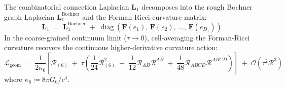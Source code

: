 \documentclass[
    12pt,
    a4paper,
    headings=normal,
    twoside=false,
    open=any,
    parskip=half
]{scrbook}
\begin{document}
\begin{phystheorem}\label{thm:ch1_bochner_weitzenboeck_discrete}
The combinatorial connection Laplacian $\mathbf{L}_1$ decomposes into the rough Bochner graph Laplacian $\mathbf{L}_1^{\text{Bochner}}$ and the Forman-Ricci curvature matrix:
\begin{equation}
\boxed{\mathbf{L}_1 \;=\; \mathbf{L}_1^{\text{Bochner}} \;+\; \operatorname{diag}\left( \mathbf{F}(e_1), \, \mathbf{F}(e_2), \, \dots, \, \mathbf{F}(e_{D_1}) \right)}
\label{eq:ch1_bochner_weitzenboeck_formula}
\end{equation}
In the coarse-grained continuum limit ($\tau \to 0$), cell-averaging the Forman-Ricci curvature recovers the continuous higher-derivative curvature action:
\begin{equation}
\mathcal{L}_{\text{geom}} \;=\; \frac{1}{2\kappa_6} \left[ \mathcal{R}_{(6)} \;+\; \tau \left( \frac{1}{24} \mathcal{R}_{(6)}^2 \;-\; \frac{1}{12} \mathcal{R}_{AB} \mathcal{R}^{AB} \;+\; \frac{1}{48} \mathcal{R}_{ABCD} \mathcal{R}^{ABCD} \right) \right] \;+\; \mathcal{O}\left(\tau^2 \mathcal{R}^3\right)
\label{eq:ch1_continuous_curvature_limit}
\end{equation}
where $\kappa_6 \coloneqq 8\pi G_6 / c^4$.
\end{phystheorem}
\end{document}
